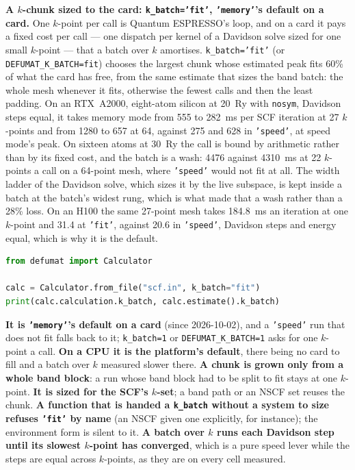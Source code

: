 \documentclass[11pt,a4paper]{article}
\newcommand{\qe}{Quantum ESPRESSO}
\newcommand{\code}[1]{\texttt{\small #1}}
\begin{document}
\textbf{A $k$-chunk sized to the card: \code{k\_batch='fit'}, \code{'memory'}'s
default on a card.} One $k$-point per call is \qe's loop, and on a card it pays a
fixed cost per call --- one dispatch per kernel of a Davidson solve sized for one small
$k$-point --- that a batch over $k$ amortises. \code{k\_batch='fit'} (or
\code{DEFUMAT\_K\_BATCH=fit}) chooses the largest chunk whose estimated peak fits
60\% of what the card has free, from the same estimate that sizes the band batch:
the whole mesh whenever it fits, otherwise the fewest calls and then the least
padding. On an RTX~A2000, eight-atom silicon at 20~Ry with \code{nosym}, Davidson
steps equal, it takes memory mode from 555 to 282~ms per SCF iteration at 27
$k$-points and from 1280 to 657 at 64, against 275 and 628 in \code{'speed'}, at
speed mode's peak. On sixteen atoms at 30~Ry the call is bound by arithmetic
rather than by its fixed cost, and the batch is a wash: 4476 against 4310~ms at
22 $k$-points a call on a 64-point mesh, where \code{'speed'} would not fit at all.
The width ladder of the Davidson solve, which sizes it by the live subspace, is
kept inside a batch at the batch's widest rung, which is what made that a wash
rather than a 28\% loss. On an H100 the same 27-point mesh takes 184.8~ms an
iteration at one $k$-point and 31.4 at \code{'fit'}, against 20.6 in
\code{'speed'}, Davidson steps and energy equal, which is why it is the default.

\begin{lstlisting}[language=Python]
from defumat import Calculator

calc = Calculator.from_file("scf.in", k_batch="fit")
print(calc.calculation.k_batch, calc.estimate().k_batch)
\end{lstlisting}

\begin{refuses}
\textbf{It is \code{'memory'}'s default on a card} (since 2026-10-02), and a
\code{'speed'} run that does not fit falls back to it; \code{k\_batch=1} or
\code{DEFUMAT\_K\_BATCH=1} asks for one $k$-point a call. \textbf{On a CPU it is
the platform's default}, there being no card to fill and a
batch over $k$ measured slower there. \textbf{A chunk is grown only from a whole
band block}: a run whose band block had to be split to fit stays at one $k$-point.
\textbf{It is sized for the SCF's $k$-set}; a band path or an NSCF set reuses the
chunk. \textbf{A function that is handed a \code{k\_batch} without a system to size
refuses \code{'fit'} by name} (an NSCF given one explicitly, for instance); the
environment form is silent to it. \textbf{A batch over $k$ runs each Davidson step
until its slowest $k$-point has converged}, which is a pure speed lever while the
steps are equal across $k$-points, as they are on every cell measured.
\end{refuses}
\end{document}
